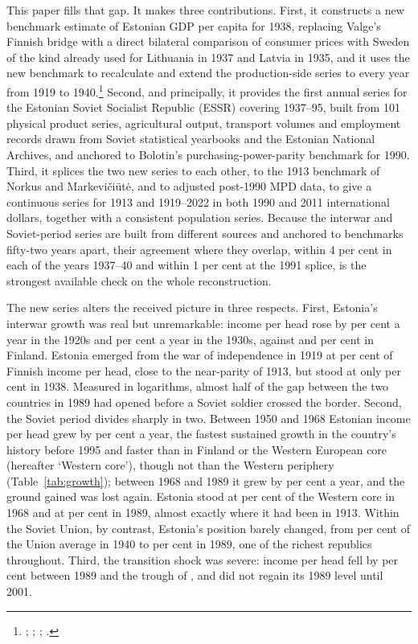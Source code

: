 \documentclass[12pt,a4paper]{article}
\begin{document}
This paper fills that gap. It makes three contributions. First, it constructs a new benchmark estimate of Estonian GDP per capita for 1938, replacing Valge's Finnish bridge with a direct bilateral comparison of consumer prices with Sweden of the kind already used for Lithuania in 1937 and Latvia in 1935, and it uses the new benchmark to recalculate and extend the production-side series to every year from 1919 to 1940.\footnote{\autocite{klimantas2019}; \autocite{norkuslatvia1935}; \autocite{klimantas2023lithuania}; \autocite{Klimantas2024}.} Second, and principally, it provides the first annual series for the Estonian Soviet Socialist Republic (ESSR) covering 1937--95, built from 101 physical product series, agricultural output, transport volumes and employment records drawn from Soviet statistical yearbooks and the Estonian National Archives, and anchored to Bolotin's purchasing-power-parity benchmark for 1990. Third, it splices the two new series to each other, to the 1913 benchmark of Norkus and Markevi\v{c}i\={u}t\.{e}, and to adjusted post-1990 MPD data, to give a continuous series for 1913 and 1919--2022 in both 1990 and 2011 international dollars, together with a consistent population series. Because the interwar and Soviet-period series are built from different sources and anchored to benchmarks fifty-two years apart, their agreement where they overlap, within 4 per cent in each of the years 1937--40 and within 1 per cent at the 1991 splice, is the strongest available check on the whole reconstruction.

The new series alters the received picture in three respects. First, Estonia's interwar growth was real but unremarkable: income per head rose by  per cent a year in the 1920s and  per cent a year in the 1930s, against  and  per cent in Finland. Estonia emerged from the war of independence in 1919 at  per cent of Finnish income per head, close to the near-parity of 1913, but stood at only  per cent in 1938. Measured in logarithms, almost half of the gap between the two countries in 1989 had opened before a Soviet soldier crossed the border. Second, the Soviet period divides sharply in two. Between 1950 and 1968 Estonian income per head grew by  per cent a year, the fastest sustained growth in the country's history before 1995 and faster than in Finland or the Western European core (hereafter `Western core'), though not than the Western periphery (Table~\ref{tab:growth}); between 1968 and 1989 it grew by  per cent a year, and the ground gained was lost again. Estonia stood at  per cent of the Western core in 1968 and at  per cent in 1989, almost exactly where it had been in 1913. Within the Soviet Union, by contrast, Estonia's position barely changed, from  per cent of the Union average in 1940 to  per cent in 1989, one of the richest republics throughout. Third, the transition shock was severe: income per head fell by \eeTROUGHpct{} per cent between 1989 and the trough of \eeTROUGHyear{}, and did not regain its 1989 level until 2001.
\end{document}
